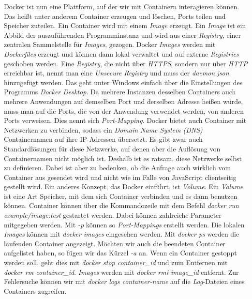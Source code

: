 \documentclass[12pt,a4paper]{scrartcl}
\begin{document}
Docker ist nun eine Plattform, auf der wir mit Containern interagieren können. Das heißt unter anderem Container erzeugen und löschen, Ports teilen und Speicher zuteilen. Ein Container wird mit einem \emph{Image} erzeugt. Ein \emph{Image} ist ein Abbild der auszuführenden Programminstanz und wird aus einer \emph{Registry}, einer zentralen Sammelstelle für \emph{Images}, gezogen. Docker \emph{Images} werden mit \emph{Dockerfiles} erzeugt und können dann lokal verwaltet und auf externe \emph{Registries} geschoben werden. Eine \emph{Registry}, die nicht über \emph{HTTPS}, sondern nur über \emph{HTTP} erreichbar ist, nennt man eine \emph{Unsecure Registry} und muss der \emph{daemon.json} hinzugefügt werden. Das geht unter Windows einfach über die Einstellungen des Programms \emph{Docker Desktop}. Da mehrere Instanzen desselben Containers auch mehrere Anwendungen auf demselben Port und derselben Adresse heißen würde, muss man auf die Ports, die von der Anwendung verwendet werden, von anderen Ports verweisen. Dies nennt sich \emph{Port-Mapping}. 
Docker bietet auch Container mit Netzwerken zu verbinden, sodass ein \emph{Domain Name System (DNS)} Containernamen auf ihre IP-Adressen übersetzt. Es gibt zwar auch Standardlösungen für diese Netzwerke, auf denen aber die Auflösung von Containernamen nicht möglich ist. Deshalb ist es ratsam, diese Netzwerke selbst zu definieren.
Dabei ist aber zu bedenken, ob die Anfrage auch wirklich vom Container aus gesendet wird und nicht wie im Falle von JavaScript clientseitig gestellt wird.
Ein anderes Konzept, das Docker einführt, ist \emph{Volume}. Ein \emph{Volume} ist eine Art Speicher, mit dem sich Container verbinden und es dann benutzen können.
Container können über die Kommandozeile mit dem Befehl  \emph{docker run example/image:test} gestartet werden. Dabei können zahlreiche Parameter mitgegeben werden. Mit \emph{-p} können so \emph{Port-Mappings} erstellt werden. Die lokalen \emph{Images} können mit \emph{docker images} eingesehen werden. Mit \emph{docker ps} werden die laufenden Container angezeigt. Möchten wir auch die beendeten Container aufgelistet haben, so fügen wir das Kürzel \emph{-a} an. Wenn ein Container gestoppt werden soll, geht dies mit \emph{docker stop container\_id} und zum Entfernen mit \emph{docker rm container\_id}. \emph{Images} werden mit \emph{docker rmi image\_id} entfernt. Zur Fehlersuche können wir mit \emph{docker logs container-name} auf die \emph{Log}-Dateien eines Containers zugreifen.\cite{docGst}
\end{document}
